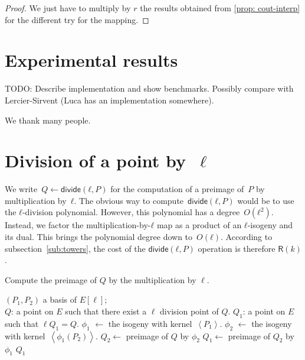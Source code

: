 \documentclass{lms}
\newcommand{\todo}[1]{{\color{red}TODO: #1}}
\def\pa#1{\left(#1\right)}
\def\chev#1{\left\langle#1\right\rangle}
\def\cout#1{\mathsf{#1}}
\def\sfdiv{\mathsf{divide}}
\begin{document}
\begin{proof}%
We just have to multiply by $r$ the results obtained from \ref{prop: cout-interp} for the different try for the mapping.
\end{proof}
  
\section{Experimental results}
\label{sec:implem}

\todo{Describe implementation and show benchmarks. Possibly compare
  with Lercier-Sirvent (Luca has an implementation somewhere).}

\begin{acknowledgements}
  We thank many people.
\end{acknowledgements}





\appendix
\section{Division of a point by~$\ell$}
\label{ap:division}

We write~$Q ← \sfdiv(ℓ, P)$ for the computation of a preimage of~$P$
by multiplication by~$ℓ$.
The obvious way to compute~$\sfdiv(ℓ, P)$ would be to use
the $ℓ$-division polynomial.
However, this polynomial has a degree~$O(ℓ^2)$.
Instead, we factor the multiplication-by-$ℓ$ map
as a product of an $ℓ$-isogeny and its dual.
This brings the polynomial degree down to~$O(ℓ)$.
According to subsection~\ref{sub:towers},
the cost of the $\sfdiv(ℓ, P)$ operation is therefore $\mathsf{R} (k)$.

\begin{algorithm}
\caption{\label{ldivision}Compute the preimage of $Q$ by the multiplication by $\ell$.}
\begin{algorithmic}[1]
\REQUIRE  $(P_1,P_2)$ a basis of $E[\ell]$;\\
$Q$: a point on $E$ such that there exist a $\ell$ division point of $Q$.
\ENSURE $Q_1$: a point on $E$ such that $\ell Q_1 = Q$.
\STATE $\phi_1$ $\leftarrow$ the isogeny with kernel~$\chev{P_1}$.
\STATE $\phi_2$ $\leftarrow$ the isogeny with kernel~$\chev{\phi_1(P_2)}$.
\STATE $Q_2 \leftarrow$ preimage of $Q$ by $\phi_2$
\STATE $Q_1 \leftarrow$ preimage of $Q_2$ by $\phi_1$
\RETURN $Q_1$
\end{algorithmic}
\end{algorithm}
\end{document}
